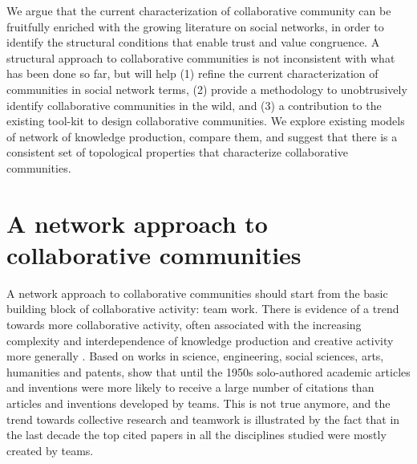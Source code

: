 We argue that the current characterization of collaborative community can be fruitfully enriched with the growing literature on social networks, in order to identify the structural conditions that enable trust and value congruence. A structural approach to collaborative communities is not inconsistent with what has been done so far, but will help (1) refine the current characterization of communities in social network terms, (2) provide a methodology to unobtrusively identify collaborative communities in the wild, and (3) a contribution to the existing tool-kit to design collaborative communities. We explore existing models of network of knowledge production, compare them, and suggest that there is a consistent set of topological properties that characterize collaborative communities.

\section{A network approach to collaborative communities}

A network approach to collaborative communities should start from the basic building block of collaborative activity: team work. There is evidence of a trend towards more collaborative activity, often associated with the increasing complexity and interdependence of knowledge production and creative activity more generally \citep*{guimera:2005,uzzi:2005,uzzi:2007a,jones:2008}. Based on works in science, engineering, social sciences, arts, humanities and patents, \citet{uzzi:2007a} show that until the 1950s solo-authored academic articles and inventions were more likely to receive a large number of citations than articles and inventions developed by teams.  This is not true anymore, and the trend towards collective research and teamwork is illustrated by the fact that in the last decade the top cited papers in all the disciplines studied were mostly created by teams.

